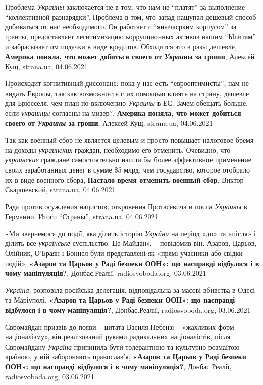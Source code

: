 Проблема \emph{Украины} заключается не в том, что нам не \enquote{платят} за выполнение
\enquote{коллективной разнарядки}. Проблема в том, что запад нащупал дешевый способ
добиваться от нас необходимого. Он работает с \enquote{янычасрким корпусом} за гранты,
предоставляет легитимизацию коррупционных активов нашим \enquote{Ылитам} и забрасывает
им подачки в виде кредитов. Обходится это в разы дешевле,
\textbf{Америка поняла, что может добиться своего от \emph{Украины} за гроши},
Алексей Кущ, strana.ua, 04.06.2021

Происходит когнитивный диссонанс: пока у нас есть \enquote{еврооптимисты}, нам не
видать Европы, так как возможность с их помощью влиять на страну, дешевле для
Брюсселя, чем план по включению \emph{Украины} в ЕС. Зачем обещать больше, если
\emph{украинцы} согласны на мизер?,
\textbf{Америка поняла, что может добиться своего от \emph{Украины} за гроши},
Алексей Кущ, strana.ua, 04.06.2021

Так как военный сбор не является целевым и просто повышает налоговое бремя на
доходы \emph{украинских} граждан, необходимо его отменить. Очевидно, что
\emph{украинские} граждане самостоятельно нашли бы более эффективное применение
своих заработанных денег в сумме \$5 млрд, чем государство, которое отобрало их
в виде военного сбора,
\textbf{Настало время отменить военный сбор},
Виктор Скаршевский, strana.ua, 04.06.2021

Рада против осуждения нацистов, откровения Протасевича и посла \emph{Украины} в Германии. Итоги \enquote{Страны},
strana.ua, 04.06.2021

«Ми звернемося до події, яка ділить історію \emph{України} на період «до» та «після» і
ділить все \emph{українське} суспільство. Це Майдан», – повідомив він. Азаров, Царьов,
Олійник, О'Браян і Боннел були представлені як «прямі учасники або свідки
подій»,
\textbf{«Азаров та Царьов у Раді безпеки ООН»: що насправді відбулося і в чому маніпуляція?},
Донбас.Реалії, radiosvoboda.org, 03.06.2021

\emph{Україна}, розповіла російська делегація, відповідальна за масові вбивства в Одесі та Маріуполі,
\textbf{«Азаров та Царьов у Раді безпеки ООН»: що насправді відбулося і в чому маніпуляція?},
Донбас.Реалії, radiosvoboda.org, 03.06.2021

Євромайдан призвів до появи – цитата Василя Небензі – «жахливих форм
націоналізму», він реалізований руками радикальних націоналістів, після
Євромайдану \emph{Україна} припинила бути толерантною та культурно розмаїтою
країною, у ній забороняють православ'я,
\textbf{«Азаров та Царьов у Раді безпеки ООН»: що насправді відбулося і в чому маніпуляція?},
Донбас.Реалії, radiosvoboda.org, 03.06.2021

